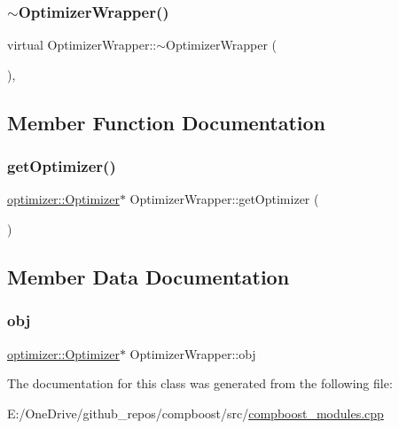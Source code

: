 \subsubsection{\texorpdfstring{$\sim$\+Optimizer\+Wrapper()}{~OptimizerWrapper()}}
{\footnotesize\ttfamily virtual Optimizer\+Wrapper\+::$\sim$\+Optimizer\+Wrapper (\begin{DoxyParamCaption}{ }\end{DoxyParamCaption})\hspace{0.3cm}{\ttfamily [inline]}, {\ttfamily [virtual]}}



\subsection{Member Function Documentation}
\mbox{\label{class_optimizer_wrapper_a422b3c46712a92935aca94a3479608da}} 
\subsubsection{\texorpdfstring{get\+Optimizer()}{getOptimizer()}}
{\footnotesize\ttfamily \mbox{\hyperlink{classoptimizer_1_1_optimizer}{optimizer\+::\+Optimizer}}$\ast$ Optimizer\+Wrapper\+::get\+Optimizer (\begin{DoxyParamCaption}{ }\end{DoxyParamCaption})\hspace{0.3cm}{\ttfamily [inline]}}



\subsection{Member Data Documentation}
\mbox{\label{class_optimizer_wrapper_ad13a4b9b51410c03d62fb668b5c91d70}} 
\subsubsection{\texorpdfstring{obj}{obj}}
{\footnotesize\ttfamily \mbox{\hyperlink{classoptimizer_1_1_optimizer}{optimizer\+::\+Optimizer}}$\ast$ Optimizer\+Wrapper\+::obj\hspace{0.3cm}{\ttfamily [protected]}}



The documentation for this class was generated from the following file\+:\begin{DoxyCompactItemize}
\item 
E\+:/\+One\+Drive/github\+\_\+repos/compboost/src/\mbox{\hyperlink{compboost__modules_8cpp}{compboost\+\_\+modules.\+cpp}}\end{DoxyCompactItemize}
